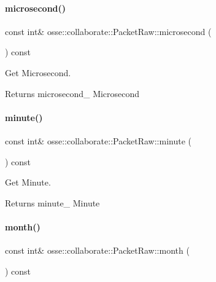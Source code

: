 \paragraph{\texorpdfstring{microsecond()}{microsecond()}}
{\footnotesize\ttfamily const int\& osse\+::collaborate\+::\+Packet\+Raw\+::microsecond (\begin{DoxyParamCaption}{ }\end{DoxyParamCaption}) const\hspace{0.3cm}{\ttfamily [inline]}}



Get Microsecond. 

\begin{DoxyReturn}{Returns}
microsecond\+\_\+ Microsecond 
\end{DoxyReturn}
\mbox{\label{classosse_1_1collaborate_1_1_packet_raw_ac8dab9ede92438259281e25bed6a72af}} 
\paragraph{\texorpdfstring{minute()}{minute()}}
{\footnotesize\ttfamily const int\& osse\+::collaborate\+::\+Packet\+Raw\+::minute (\begin{DoxyParamCaption}{ }\end{DoxyParamCaption}) const\hspace{0.3cm}{\ttfamily [inline]}}



Get Minute. 

\begin{DoxyReturn}{Returns}
minute\+\_\+ Minute 
\end{DoxyReturn}
\mbox{\label{classosse_1_1collaborate_1_1_packet_raw_a1aec62b6f1c6ca8a332cbc1a9c299e25}} 
\paragraph{\texorpdfstring{month()}{month()}}
{\footnotesize\ttfamily const int\& osse\+::collaborate\+::\+Packet\+Raw\+::month (\begin{DoxyParamCaption}{ }\end{DoxyParamCaption}) const\hspace{0.3cm}{\ttfamily [inline]}}



